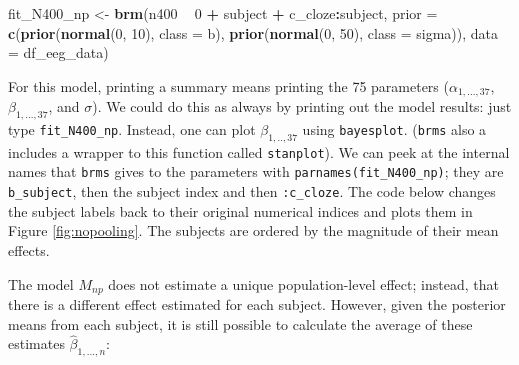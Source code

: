 \documentclass[12pt,]{krantz}
\newenvironment{Shaded}{\begin{snugshade}}{\end{snugshade}}
\newcommand{\CommentTok}[1]{\textcolor[rgb]{0.56,0.35,0.01}{\textit{#1}}}
\newcommand{\DataTypeTok}[1]{\textcolor[rgb]{0.13,0.29,0.53}{#1}}
\newcommand{\DecValTok}[1]{\textcolor[rgb]{0.00,0.00,0.81}{#1}}
\newcommand{\KeywordTok}[1]{\textcolor[rgb]{0.13,0.29,0.53}{\textbf{#1}}}
\newcommand{\NormalTok}[1]{#1}
\newcommand{\OperatorTok}[1]{\textcolor[rgb]{0.81,0.36,0.00}{\textbf{#1}}}
\newcommand{\StringTok}[1]{\textcolor[rgb]{0.31,0.60,0.02}{#1}}
\theoremstyle{definition}
\theoremstyle{definition}
\theoremstyle{definition}
\theoremstyle{remark}
\begin{document}
\begin{Shaded}
\begin{Highlighting}[]
\NormalTok{fit_N400_np <-}\StringTok{ }\KeywordTok{brm}\NormalTok{(n400 }\OperatorTok{~}\StringTok{ }\DecValTok{0} \OperatorTok{+}\StringTok{ }\NormalTok{subject }\OperatorTok{+}\StringTok{ }\NormalTok{c_cloze}\OperatorTok{:}\NormalTok{subject,}
                 \DataTypeTok{prior =}
                     \KeywordTok{c}\NormalTok{(}\KeywordTok{prior}\NormalTok{(}\KeywordTok{normal}\NormalTok{(}\DecValTok{0}\NormalTok{, }\DecValTok{10}\NormalTok{), }\DataTypeTok{class =}\NormalTok{ b),}
                       \KeywordTok{prior}\NormalTok{(}\KeywordTok{normal}\NormalTok{(}\DecValTok{0}\NormalTok{, }\DecValTok{50}\NormalTok{), }\DataTypeTok{class =}\NormalTok{ sigma)),}
                 \DataTypeTok{data =}\NormalTok{ df_eeg_data)}
\end{Highlighting}
\end{Shaded}

For this model, printing a summary means printing the 75 parameters (\(\alpha_{1,...,37}\), \(\beta_{1,...,37}\), and \(\sigma\)). We could do this as always by printing out the model results: just type \texttt{fit\_N400\_np}. Instead, one can plot \(\beta_{1,..,37}\) using \texttt{bayesplot}. (\texttt{brms} also a includes a wrapper to this function called \texttt{stanplot}). We can peek at the internal names that \texttt{brms} gives to the parameters with \texttt{parnames(fit\_N400\_np)}; they are \texttt{b\_subject}, then the subject index and then \texttt{:c\_cloze}. The code below changes the subject labels back to their original numerical indices and plots them in Figure \ref{fig:nopooling}. The subjects are ordered by the magnitude of their mean effects.

The model \(M_{np}\) does not estimate a unique population-level effect; instead, that there is a different effect estimated for each subject. However, given the posterior means from each subject, it is still possible to calculate the average of these estimates \(\hat\beta_{1,...,n}\):

\begin{Shaded}
\end{Shaded}
\end{document}
